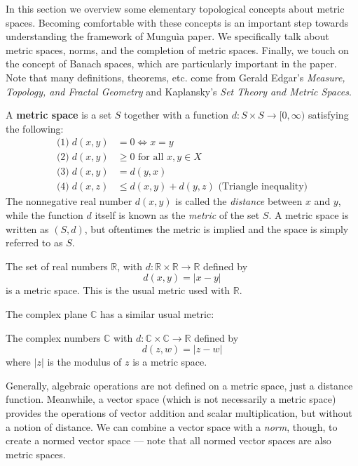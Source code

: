 In this section we overview some elementary topological concepts about metric spaces.  Becoming comfortable with these concepts is an important step towards understanding the framework of Mungu{\`i}a \etals paper.  We specifically talk about metric spaces, norms, and the completion of metric spaces.  Finally, we touch on the concept of Banach spaces, which are particularly important in the paper.  Note that many definitions, theorems, etc. come from Gerald Edgar's \textit{Measure, Topology, and Fractal Geometry} and Kaplansky's \textit{Set Theory and Metric Spaces}.

\begin{defn}
A \textbf{metric space} is a set $S$ together with a function $d:S \times S \rightarrow [0, \infty)$ satisfying the following:
\begin{align*}
\textrm{(1)}\; d(x,y) &= 0 \Leftrightarrow x = y\\
\textrm{(2)}\; d(x,y) &\geq 0 \textrm{ for all } x,y \in X\\
\textrm{(3)}\; d(x,y) &= d(y,x)\\
\textrm{(4)}\; d(x,z) &\leq d(x,y) + d(y,z) \textrm{ (Triangle inequality)}
\end{align*}
The nonnegative real number $d(x,y)$ is called the \textit{distance} between $x$ and $y$, while the function $d$ itself is known as the \textit{metric} of the set $S$.  A metric space is written as $(S, d)$, but oftentimes the metric is implied and the space is simply referred to as $S$.  
\end{defn}

\begin{example}
The set of real numbers $\mathbb{R}$, with $d: \mathbb{R} \times \mathbb{R} \rightarrow \mathbb{R}$ defined by
\[d(x,y) = |x - y| \]
is a metric space.  This is the usual metric used with $\mathbb{R}$.
\end{example}

The complex plane $\mathbb{C}$ has a similar usual metric:

\begin{example}
The complex numbers $\mathbb{C}$ with $d: \mathbb{C} \times \mathbb{C} \rightarrow \mathbb{R}$ defined by
\[d(z,w) = |z - w| \]
where $|z|$ is the modulus of $z$ is a metric space.
\end{example}

Generally, algebraic operations are not defined on a metric space, just a distance function.  Meanwhile, a vector space (which is not necessarily a metric space) provides the operations of vector addition and scalar multiplication, but without a notion of distance.  We can combine a vector space with a \textit{norm}, though, to create a normed vector space --- note that all normed vector spaces are also metric spaces.

